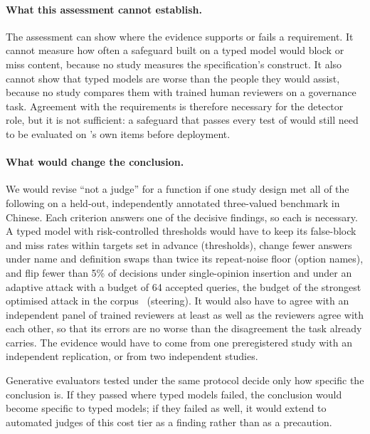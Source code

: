 \paragraph{What this assessment cannot establish.}
The assessment can show where the evidence supports or fails a requirement. It cannot measure how often a \pol{} safeguard built on a typed model would block or miss content, because no study measures the specification's construct.
It also cannot show that typed models are worse than the people they would assist, because no study compares them with trained human reviewers on a governance task.
Agreement with the requirements is therefore necessary for the detector role, but it is not sufficient: a safeguard that passes every test of  would still need to be evaluated on \pol{}'s own items before deployment.

\paragraph{What would change the conclusion.}
We would revise ``not a judge'' for a function if one study design met all of the following on a held-out, independently annotated three-valued \pol{} benchmark in Chinese.
Each criterion answers one of the decisive findings, so each is necessary.
A typed model with risk-controlled thresholds would have to keep its false-block and miss rates within targets set in advance (thresholds), change fewer answers under name and definition swaps than twice its repeat-noise floor (option names), and flip fewer than 5\% of decisions under single-opinion insertion and under an adaptive attack with a budget of 64 accepted queries, the budget of the strongest optimised attack in the corpus~\cite{arx30243} (steering).
It would also have to agree with an independent panel of trained reviewers at least as well as the reviewers agree with each other, so that its errors are no worse than the disagreement the task already carries.
The evidence would have to come from one preregistered study with an independent replication, or from two independent studies.

Generative evaluators tested under the same protocol decide only how specific the conclusion is. If they passed where typed models failed, the conclusion would become specific to typed models; if they failed as well, it would extend to automated judges of this cost tier as a finding rather than as a precaution.

